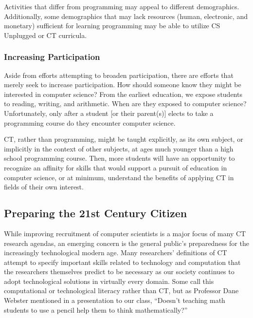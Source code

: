 \documentclass{acm_proc_article-sp}
\begin{document}
Activities that differ from programming may appeal to different demographics. Additionally, some demographics that may lack resources (human, electronic, and monetary) sufficient for learning programming may be able to utilize CS Unplugged or CT curricula.

\subsubsection{Increasing Participation}
Aside from efforts attempting to broaden participation, there are efforts that merely seek to increase participation. How should someone know they might be interested in computer science? From the earliest education, we expose students to reading, writing, and arithmetic. When are they exposed to computer science? Unfortunately, only after a student [or their parent(s)] elects to take a programming course do they encounter computer science. 

CT, rather than programming, might be taught explicitly, as its own subject, or implicitly in the context of other subjects, at ages much younger than a high school programming course. Then, more students will have an opportunity to recognize an affinity for skills that would support a pursuit of education in computer science, or at minimum, understand the benefits of applying CT in fields of their own interest.

\subsection{Preparing the 21st Century Citizen}
While improving recruitment of computer scientists is a major focus of many CT research agendas, an emerging concern is the general public’s preparedness for the increasingly technological modern age. Many researchers’ definitions of CT attempt to specify important skills related to technology and computation that the researchers themselves predict to be necessary as our society continues to adopt technological solutions in virtually every domain. Some call this computational or technological literacy rather than CT, but as Professor Dane Webster mentioned in a presentation to our class, “Doesn’t teaching math students to use a pencil help them to think mathematically?”
\end{document}
